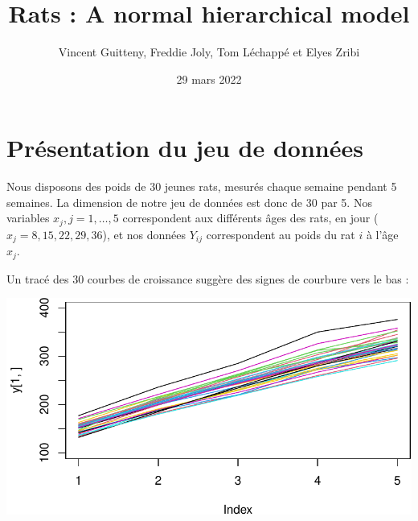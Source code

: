 \documentclass[
]{article}
\title{Rats : A normal hierarchical model}
\author{Vincent Guitteny, Freddie Joly, Tom Léchappé et Elyes Zribi}
\date{29 mars 2022}
\begin{document}
\maketitle

\newenvironment{cols}[1][]{}{}
\newenvironment{col}[1]{\begin{minipage}{#1}\ignorespaces}{%
\end{minipage}
\ifhmode\unskip\fi
\aftergroup\useignorespacesandallpars}
\def\useignorespacesandallpars#1\ignorespaces\fi{%
#1\fi\ignorespacesandallpars}
\makeatletter
\def\ignorespacesandallpars{%
  \@ifnextchar\par
    {\expandafter\ignorespacesandallpars\@gobble}%
    {}%
}
\makeatother

\renewcommand\contentsname{Table des matières}
\newpage
\tableofcontents
\newpage

\hypertarget{pruxe9sentation-du-jeu-de-donnuxe9es}{%
\section{Présentation du jeu de
données}\label{pruxe9sentation-du-jeu-de-donnuxe9es}}

Nous disposons des poids de 30 jeunes rats, mesurés chaque semaine
pendant 5 semaines. La dimension de notre jeu de données est donc de 30
par 5. Nos variables \(x_j,j=1,…,5\) correspondent aux différents âges
des rats, en jour (\(x_j = {8,15,22,29,36}\)), et nos données \(Y_{ij}\)
correspondent au poids du rat \(i\) à l'âge \(x_j\).

Un tracé des 30 courbes de croissance suggère des signes de courbure
vers le bas :

\begin{center}\includegraphics{Rats---A-normal-hierarchical-model_files/figure-latex/unnamed-chunk-1-1} \end{center}
\end{document}

